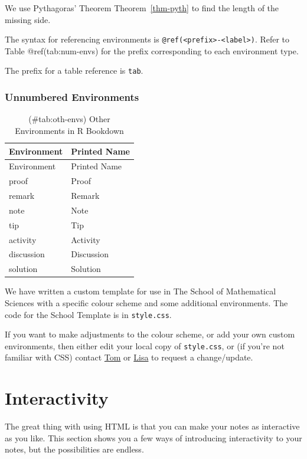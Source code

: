 \documentclass[
  letterpaper,
  oneside]{book}
\numberwithin{equation}{section}
\numberwithin{figure}{section}
\theoremstyle{break}
\theoremstyle{plain}
\theoremstyle{remark}
\begin{document}
We use Pythagoras' Theorem Theorem~\ref{thm-pyth} to find the length of
the missing side.

The syntax for referencing environments is
\texttt{@ref(\textless{}prefix\textgreater{}-\textless{}label\textgreater{})}.
Refer to Table @ref(tab:num-envs) for the prefix corresponding to each
environment type.

The prefix for a table reference is \texttt{tab}.

\subsection{Unnumbered Environments}\label{unnumbered-environments}

\begin{longtable}[]{@{}ll@{}}
\caption{(\#tab:oth-envs) Other Environments in R
Bookdown}\tabularnewline
\toprule\noalign{}
Environment & Printed Name \\
\midrule\noalign{}
\endfirsthead
\toprule\noalign{}
Environment & Printed Name \\
\midrule\noalign{}
\endhead
\bottomrule\noalign{}
\endlastfoot
proof & Proof \\
remark & Remark \\
note & Note \\
tip & Tip \\
activity & Activity \\
discussion & Discussion \\
solution & Solution \\
\end{longtable}

We have written a custom template for use in The School of Mathematical
Sciences with a specific colour scheme and some additional environments.
The code for the School Template is in \texttt{style.css}.

If you want to make adjustments to the colour scheme, or add your own
custom environments, then either edit your local copy of
\texttt{style.css}, or (if you're not familiar with CSS) contact
\href{mailto:tom.wicks@nottingham.ac.uk}{Tom} or
\href{mailto:lisa.mott@nottingham.ac.uk}{Lisa} to request a
change/update.


\chapter{Interactivity}\label{interactivity}

The great thing with using HTML is that you can make your notes as
interactive as you like. This section shows you a few ways of
introducing interactivity to your notes, but the possibilities are
endless.
\end{document}
